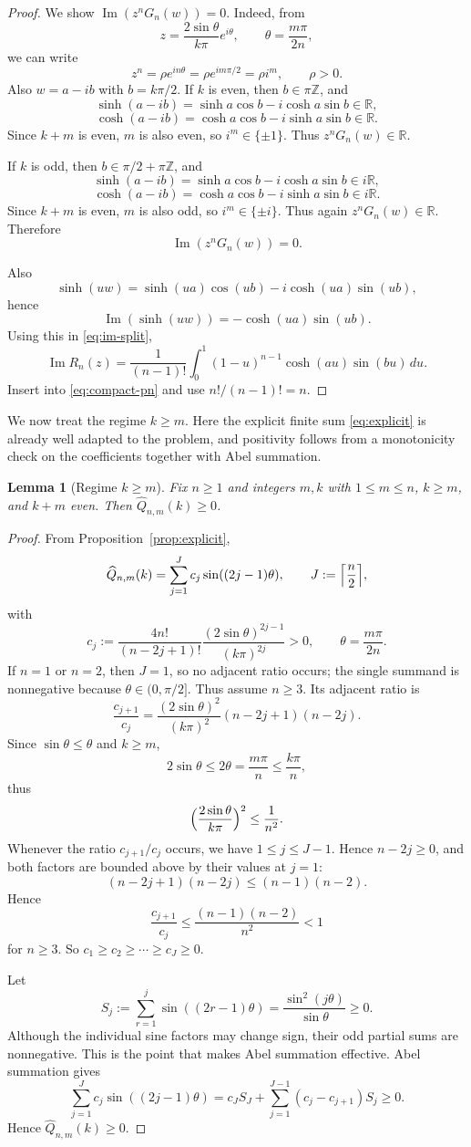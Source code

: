 \documentclass[a4paper,12pt]{amsart}
\newtheorem{lemma}[theorem]{Lemma}
\theoremstyle{definition}
\theoremstyle{remark}
\newcommand{\bbR}{\mathbb R}
\newcommand{\bbZ}{\mathbb Z}
\DeclareMathOperator{\ImagPart}{Im}
\renewcommand{\Im}{\ImagPart}
\begin{document}
\begin{proof}
We show $\Im(z^nG_n(w))=0$. Indeed, from
\[ 
z=\frac{2\sin\theta}{k\pi}e^{i\theta}, \qquad \theta=\frac{m\pi}{2n}, 
\]
we can write 
\[ 
z^n=\rho e^{in\theta}=\rho e^{im\pi/2}=\rho i^m, \qquad \rho>0. 
\]
Also $w=a-ib$ with $b=k\pi/2$. If $k$ is even, then $b\in\pi\bbZ$, and
\[ \sinh(a-ib)= \sinh a\cos b-i\cosh a\sin b\in\bbR, \]
\[ \cosh(a-ib)= \cosh a\cos b-i\sinh a\sin b\in\bbR. \]
Since $k+m$ is even, $m$ is also even, so $i^m\in\{\pm1\}$. Thus $z^nG_n(w)\in\bbR$.

If $k$ is odd, then $b\in\pi/2+\pi\bbZ$, and 
\[ \sinh(a-ib)=\sinh a\cos b-i\cosh a\sin b\in i\bbR, \] 
\[ \cosh(a-ib)=\cosh a\cos b-i\sinh a\sin b\in i\bbR. \]
Since $k+m$ is even, $m$ is also odd, so $i^m\in\{\pm i\}$. Thus again $z^nG_n(w)\in\bbR$. Therefore \[ \Im(z^nG_n(w))=0. \]

Also
\[
\sinh(uw)=\sinh(ua)\cos(ub)-i\cosh(ua)\sin(ub),
\]
hence
\[
\Im(\sinh(uw))=-\cosh(ua)\sin(ub).
\]
Using this in \eqref{eq:im-split},
\[
\Im R_n(z)=\frac{1}{(n-1)!}\int_0^1(1-u)^{n-1}\cosh(au)\sin(bu)\,du.
\]
Insert into \eqref{eq:compact-pn} and use $n!/(n-1)!=n$.
\end{proof}


We now treat the regime $k \ge m$. Here the explicit finite sum \eqref{eq:explicit} is already well adapted to the problem, and positivity follows from a monotonicity check on the coefficients together with Abel summation.

\begin{lemma}[Regime $k\ge m$]\label{lem:k-ge-m}
Fix $n\ge1$ and integers $m,k$ with $1\le m\le n$, $k\ge m$, and $k+m$ even.
Then $\widehat Q_{n,m}(k)\ge0$.
\end{lemma}

\begin{proof}
From Proposition~\ref{prop:explicit},
\[
\widehat Q_{n,m}(k)=\sum_{j=1}^{J} c_j\sin((2j-1)\theta),
\qquad
J:=\Bigl\lceil\frac n2\Bigr\rceil,
\]
with
\[
c_j:=\frac{4n!}{(n-2j+1)!}\frac{(2\sin\theta)^{2j-1}}{(k\pi)^{2j}}>0,
\qquad
\theta=\frac{m\pi}{2n}.
\]
If $n=1$ or $n=2$, then $J=1$, so no adjacent ratio occurs; the single summand is nonnegative because $\theta\in(0,\pi/2]$. Thus assume $n\ge3$. Its adjacent ratio is
\[
\frac{c_{j+1}}{c_j}
=\frac{(2\sin\theta)^2}{(k\pi)^2}(n-2j+1)(n-2j).
\]
Since $\sin\theta\le\theta$ and $k\ge m$,
\[
2\sin\theta\le 2\theta=\frac{m\pi}{n}\le\frac{k\pi}{n},
\]
thus 
\[ 
\Bigl(\frac{2\sin\theta}{k\pi}\Bigr)^2\le\frac1{n^2}. 
\]
Whenever the ratio $c_{j+1}/c_j$ occurs, we have  $1\le j\le J-1$. Hence $n-2j\ge0$, and both factors are bounded above by their values at $j=1$:
\[ 
(n-2j+1)(n-2j)\le (n-1)(n-2). 
\] 
Hence 
\[ 
\frac{c_{j+1}}{c_j} \le \frac{(n-1)(n-2)}{n^2}<1 
\] 
for $n \ge 3$. So $c_1\ge c_2\ge\cdots\ge c_J\ge0$.

Let
\[
S_j:=\sum_{r=1}^j \sin((2r-1)\theta)
=\frac{\sin^2(j\theta)}{\sin\theta}\ge0.
\]
Although the individual sine factors may change sign, their odd partial sums are nonnegative. This is the point that makes Abel summation effective. Abel summation gives
\[
\sum_{j=1}^{J} c_j\sin((2j-1)\theta)
=c_JS_J+\sum_{j=1}^{J-1}(c_j-c_{j+1})S_j\ge0.
\]
Hence $\widehat Q_{n,m}(k)\ge0$.
\end{proof}
\end{document}
